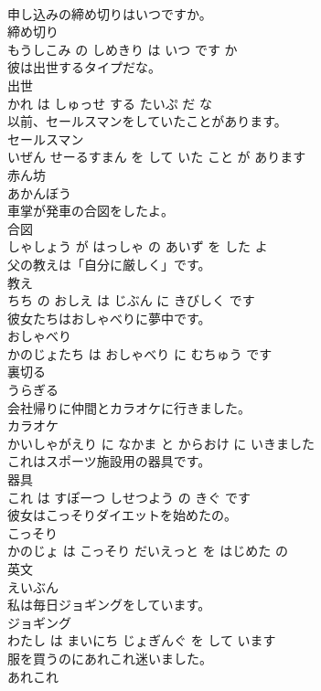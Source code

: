 \documentclass[8pt]{extreport}
\begin{document}
\begin{CJK}{UTF8}{min}
\\	申し込みの締め切りはいつですか。	
\\	締め切り 
\\	もうしこみ の しめきり は いつ です か			
\\	彼は出世するタイプだな。	
\\	出世 
\\	かれ は しゅっせ する たいぷ だ な			
\\	以前、セールスマンをしていたことがあります。	
\\	セールスマン 
\\	いぜん せーるすまん を して いた こと が あります			
\\	赤ん坊	
\\	あかんぼう			
\\	車掌が発車の合図をしたよ。	
\\	合図 
\\	しゃしょう が はっしゃ の あいず を した よ			
\\	父の教えは「自分に厳しく」です。	
\\	教え 
\\	ちち の おしえ は じぶん に きびしく です			
\\	彼女たちはおしゃべりに夢中です。	
\\	おしゃべり 
\\	かのじょたち は おしゃべり に むちゅう です			
\\	裏切る	
\\	うらぎる			
\\	会社帰りに仲間とカラオケに行きました。	
\\	カラオケ 
\\	かいしゃがえり に なかま と からおけ に いきました			
\\	これはスポーツ施設用の器具です。	
\\	器具 
\\	これ は すぽーつ しせつよう の きぐ です			
\\	彼女はこっそりダイエットを始めたの。	
\\	こっそり 
\\	かのじょ は こっそり だいえっと を はじめた の			
\\	英文	
\\	えいぶん			
\\	私は毎日ジョギングをしています。	
\\	ジョギング 
\\	わたし は まいにち じょぎんぐ を して います			
\\	服を買うのにあれこれ迷いました。	
\\	あれこれ 

\end{CJK}
\end{document}
